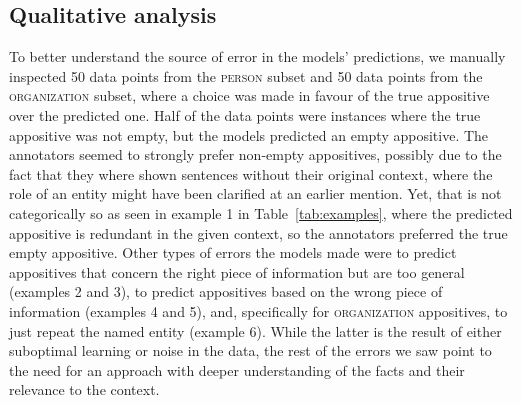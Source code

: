 \documentclass[11pt]{article}
\begin{document}
\subsection{Qualitative analysis}
To better understand the source of error in the models' predictions, we manually inspected 50 data points from  the \textsc{person} subset and 50 data points from the \textsc{organization} subset, where a choice was made in favour of the true appositive over the predicted one. Half of the data points were instances where the true appositive was not empty, but the models predicted an empty appositive. The annotators seemed to strongly prefer non-empty appositives, possibly due to the fact that they where shown sentences without their original context, where the role of an entity might have been clarified at an earlier mention. Yet, that is not categorically so as seen in example 1 in Table~\ref{tab:examples}, where the predicted appositive is redundant in the given context, so the annotators preferred the true empty appositive. Other types of errors the models made were to predict appositives that concern the right piece of information but are too general (examples 2 and 3), to predict appositives based on the wrong piece of information (examples 4 and 5), and, specifically for \textsc{organization} appositives, to just repeat the named entity (example 6).   While the latter is the result of either suboptimal learning or noise in the data, the rest of the errors we saw point to the need for an approach with deeper understanding of the facts and their relevance to the context.
\end{document}
